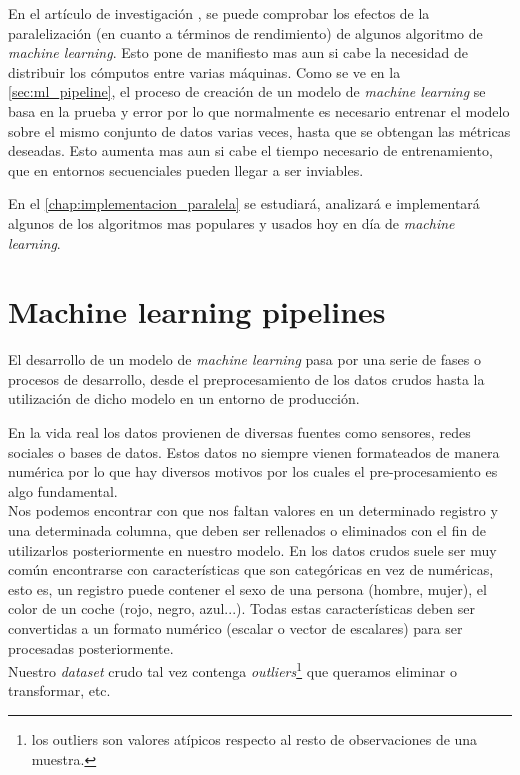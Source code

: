 En el artículo de investigación \cite{NIPS2006_3150}, se puede comprobar los efectos de la paralelización
(en cuanto a términos de rendimiento) de algunos algoritmo de \textit{machine learning}. Esto pone de
manifiesto mas aun si cabe la necesidad de distribuir los cómputos entre varias máquinas. Como se ve en
la \autoref{sec:ml_pipeline}, el proceso de creación de un modelo de \textit{machine learning} se basa en
la prueba y error por lo que normalmente es necesario entrenar el modelo sobre el mismo conjunto de datos
varias veces, hasta que se obtengan las métricas deseadas. Esto aumenta mas aun si cabe el tiempo necesario
de entrenamiento, que en entornos secuenciales pueden llegar a ser inviables.
\newline

En el \autoref{chap:implementacion_paralela} se estudiará, analizará e implementará algunos de los algoritmos mas populares
y usados hoy en día de \textit{machine learning}.

\section{Machine learning pipelines}\label{sec:ml_pipeline}
El desarrollo de un modelo de \textit{machine learning} pasa por una serie de fases o procesos de desarrollo,
desde el preprocesamiento de los datos crudos hasta la utilización de dicho modelo en un entorno
de producción.

En la vida real los datos provienen de diversas fuentes como sensores, redes sociales o bases de datos.
Estos datos no siempre vienen formateados de manera numérica por lo que
hay diversos motivos por los cuales el pre-procesamiento es algo fundamental.\\
Nos podemos encontrar con que nos faltan valores en un determinado registro y una determinada columna,
que deben ser rellenados o eliminados con el fin de utilizarlos posteriormente en nuestro modelo.
En los datos crudos suele ser muy común encontrarse con características que son categóricas en 
vez de numéricas, esto es, un registro puede contener el sexo de una persona (hombre, mujer), el color 
de un coche (rojo, negro, azul...). 
Todas estas características deben ser convertidas a un formato numérico (escalar o vector de escalares) 
para ser procesadas posteriormente.\\
Nuestro \textit{dataset} crudo tal vez contenga \textit{outliers}\footnote{los outliers son 
valores atípicos  respecto al resto de observaciones de una muestra.} que queramos eliminar o 
transformar, etc.
\newline

